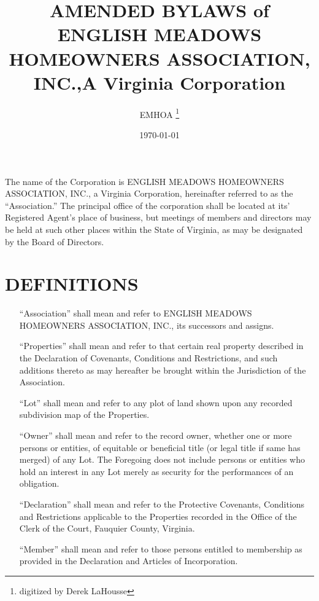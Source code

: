 \documentclass[10pt, letterpaper]{article}
\title{AMENDED BYLAWS of ENGLISH MEADOWS HOMEOWNERS ASSOCIATION, INC.,\linebreak[0] A Virginia Corporation}
\author{EMHOA \thanks{digitized by Derek LaHousse}}
\date{\today}
\begin{document}
\maketitle

\tableofcontents

\section{}
The name of the Corporation is ENGLISH MEADOWS HOMEOWNERS ASSOCIATION, INC., a Virginia Corporation, hereinafter referred to as the ``Association.''
The principal office of the corporation shall be located at its' Registered Agent's place of business, but meetings of members and directors may be held at such other places within the State of Virginia, as may be designated by the Board of Directors.

\section{DEFINITIONS}
\begin{enumerate}
  \item[``Association''] shall mean and refer to ENGLISH MEADOWS HOMEOWNERS ASSOCIATION, INC., its successors and assigns.
  \item[``Properties''] shall mean and refer to that certain real property described in the Declaration of Covenants, Conditions and Restrictions, and such additions thereto as may hereafter be brought within the Jurisdiction of the Association.
  \item[``Lot''] shall mean and refer to any plot of land shown upon any recorded subdivision map of the Properties.
  \item[``Owner''] shall mean and refer to the record owner, whether one or more persons or entities, of equitable or beneficial title (or legal title if same has merged) of any Lot.
    The Foregoing does not include persons or entities who hold an interest in any Lot merely as security for the performances of an obligation.
  \item[``Declaration''] shall mean and refer to the Protective Covenants, Conditions and Restrictions applicable to the Properties recorded in the Office of the Clerk of the Court, Fauquier County, Virginia.
  \item[``Member''] shall mean and refer to those persons entitled to membership as provided in the Declaration and Articles of Incorporation.
\end{enumerate}
\end{document}
